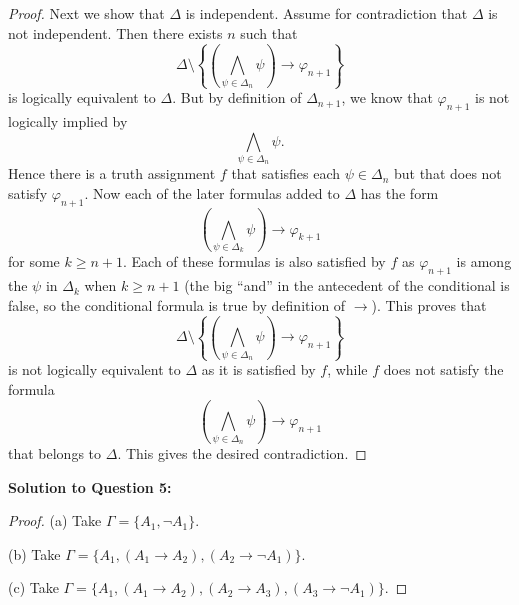 \documentclass{article}
\begin{document}
\begin{proof}
Next we show that \(\Delta\) is independent. Assume for contradiction that \(\Delta\) is not independent. Then there exists \(n\) such that
\[
\Delta \setminus \left\{\left(\bigwedge_{\psi \in \Delta_n} \psi \right) \to \varphi_{n+1}\right\}
\]
is logically equivalent to \(\Delta\). But by definition of \(\Delta_{n+1}\), we know that \(\varphi_{n+1}\) is not logically implied by
\[
\bigwedge_{\psi \in \Delta_n} \psi.
\]
Hence there is a truth assignment \(f\) that satisfies each \(\psi \in \Delta_n\) but that does not satisfy \(\varphi_{n+1}\). Now each of the later formulas added to \(\Delta\) has the form
\[
\left(\bigwedge_{\psi \in \Delta_k} \psi \right) \to \varphi_{k+1}
\]
for some \(k \geq n+1\). Each of these formulas is also satisfied by \(f\) as \(\varphi_{n+1}\) is among the \(\psi\) in \(\Delta_k\) when \(k \geq n+1\) (the big “and” in the antecedent of the conditional is false, so the conditional formula is true by definition of \(\to\)). This proves that
\[
\Delta \setminus \left\{\left(\bigwedge_{\psi \in \Delta_n} \psi \right) \to \varphi_{n+1}\right\}
\]
is not logically equivalent to \(\Delta\) as it is satisfied by \(f\), while \(f\) does not satisfy the formula
\[
\left(\bigwedge_{\psi \in \Delta_n} \psi \right) \to \varphi_{n+1}
\]
that belongs to \(\Delta\). This gives the desired contradiction.
\end{proof}

\textbf{Solution to Question 5:}
\begin{proof}
(a) Take \(\Gamma = \{A_1, \neg A_1\}\).

(b) Take \(\Gamma = \{A_1, (A_1 \to A_2), (A_2 \to \neg A_1)\}\).

(c) Take $\Gamma = \{A_1, (A_1 \to A_2), (A_2 \to A_3), (A_3 \to \neg A_1)\}$.
\end{proof}
\end{document}

